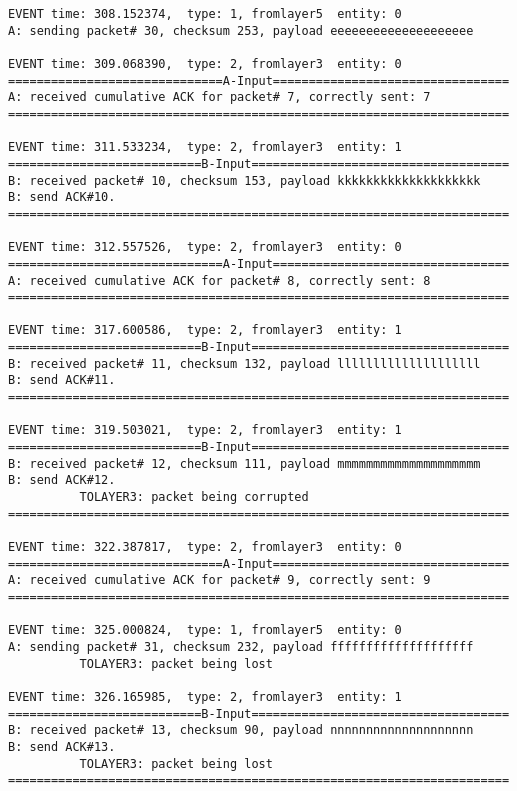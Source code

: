 \documentclass[12pt]{article}
\begin{document}
\begin{verbatim}
EVENT time: 308.152374,  type: 1, fromlayer5  entity: 0
A: sending packet# 30, checksum 253, payload eeeeeeeeeeeeeeeeeeee

EVENT time: 309.068390,  type: 2, fromlayer3  entity: 0
==============================A-Input=================================
A: received cumulative ACK for packet# 7, correctly sent: 7
======================================================================

EVENT time: 311.533234,  type: 2, fromlayer3  entity: 1
===========================B-Input====================================
B: received packet# 10, checksum 153, payload kkkkkkkkkkkkkkkkkkkk
B: send ACK#10.
======================================================================

EVENT time: 312.557526,  type: 2, fromlayer3  entity: 0
==============================A-Input=================================
A: received cumulative ACK for packet# 8, correctly sent: 8
======================================================================

EVENT time: 317.600586,  type: 2, fromlayer3  entity: 1
===========================B-Input====================================
B: received packet# 11, checksum 132, payload llllllllllllllllllll
B: send ACK#11.
======================================================================

EVENT time: 319.503021,  type: 2, fromlayer3  entity: 1
===========================B-Input====================================
B: received packet# 12, checksum 111, payload mmmmmmmmmmmmmmmmmmmm
B: send ACK#12.
          TOLAYER3: packet being corrupted
======================================================================

EVENT time: 322.387817,  type: 2, fromlayer3  entity: 0
==============================A-Input=================================
A: received cumulative ACK for packet# 9, correctly sent: 9
======================================================================

EVENT time: 325.000824,  type: 1, fromlayer5  entity: 0
A: sending packet# 31, checksum 232, payload ffffffffffffffffffff
          TOLAYER3: packet being lost

EVENT time: 326.165985,  type: 2, fromlayer3  entity: 1
===========================B-Input====================================
B: received packet# 13, checksum 90, payload nnnnnnnnnnnnnnnnnnnn
B: send ACK#13.
          TOLAYER3: packet being lost
======================================================================


\end{verbatim}
\end{document}
